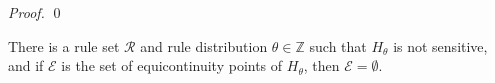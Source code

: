 \documentclass[runningheads]{llncs}
\newcommand{\Z}{\mathbb{Z}}
\begin{document}
\begin{proof}



\qed
\end{proof}



\begin{theorem} \label{equicounter2} 
There is a rule set $\mathcal{R}$ and rule distribution $\theta \in \mathcal{\Z}$ such that $H_\theta$ is not sensitive, and if $\mathcal{E}$ is the set of equicontinuity points of $H_\theta$, then $\mathcal{E} = \emptyset$.
\end{theorem}
\end{document}
